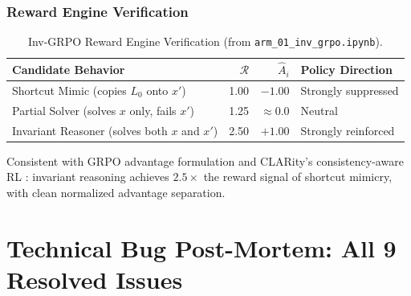 \documentclass[12pt, a4paper]{article}
\begin{document}
\subsubsection{Reward Engine Verification}

\begin{table}[H]
\centering
\small
\caption{Inv-GRPO Reward Engine Verification (from \texttt{arm\_01\_inv\_grpo.ipynb}).}
\label{tab:invgrpo_rewards}
\begin{tabularx}{\textwidth}{l r r X}
\toprule
\textbf{Candidate Behavior} & \textbf{$\mathcal{R}$} & \textbf{$\hat{A}_i$} & \textbf{Policy Direction} \\
\midrule
Shortcut Mimic (copies $L_0$ onto $x'$)         & 1.00 & $-1.00$ & \textcolor{AlertRed}{Strongly suppressed} \\
Partial Solver (solves $x$ only, fails $x'$)    & 1.25 & $\approx 0.0$ & Neutral \\
Invariant Reasoner (solves both $x$ and $x'$)   & 2.50 & $+1.00$ & \textcolor{SuccessGreen}{Strongly reinforced} \\
\bottomrule
\end{tabularx}
\end{table}

\noindent Consistent with GRPO advantage formulation \cite{grpo_deepseek} and CLARity's consistency-aware RL \cite{clarity_rl}: invariant reasoning achieves $2.5\times$ the reward signal of shortcut mimicry, with clean normalized advantage separation.

\section{Technical Bug Post-Mortem: All 9 Resolved Issues}
\label{sec:bugs}
\end{document}
